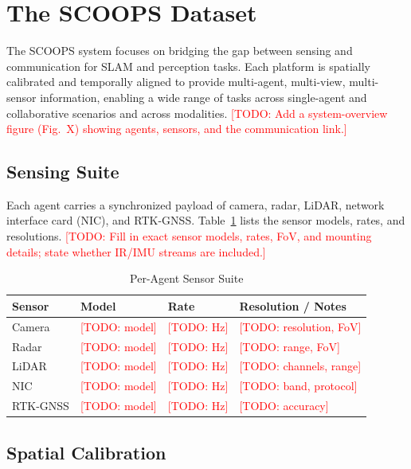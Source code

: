 \documentclass[conference]{IEEEtran}
\newcommand{\todo}[1]{\textcolor{red}{[TODO: #1]}}
\begin{document}
\section{The SCOOPS Dataset}
\label{sec:dataset}
The SCOOPS system focuses on bridging the gap between sensing and
communication for SLAM and perception tasks. Each platform is spatially
calibrated and temporally aligned to provide multi-agent, multi-view,
multi-sensor information, enabling a wide range of tasks across single-agent
and collaborative scenarios and across modalities.
\todo{Add a system-overview figure (Fig.~X) showing agents, sensors, and
the communication link.}

\subsection{Sensing Suite}
Each agent carries a synchronized payload of camera, radar, LiDAR, network
interface card (NIC), and RTK-GNSS. Table~\ref{tab:sensors} lists the
sensor models, rates, and resolutions.
\todo{Fill in exact sensor models, rates, FoV, and mounting details; state
whether IR/IMU streams are included.}

\begin{table}[htbp]
\caption{Per-Agent Sensor Suite}
\begin{center}
\begin{tabular}{llll}
\toprule
\textbf{Sensor} & \textbf{Model} & \textbf{Rate} & \textbf{Resolution / Notes} \\
\midrule
Camera    & \todo{model} & \todo{Hz} & \todo{resolution, FoV} \\
Radar     & \todo{model} & \todo{Hz} & \todo{range, FoV} \\
LiDAR     & \todo{model} & \todo{Hz} & \todo{channels, range} \\
NIC       & \todo{model} & \todo{Hz} & \todo{band, protocol} \\
RTK-GNSS  & \todo{model} & \todo{Hz} & \todo{accuracy} \\
\bottomrule
\end{tabular}
\label{tab:sensors}
\end{center}
\end{table}

\subsection{Spatial Calibration}
\end{document}
